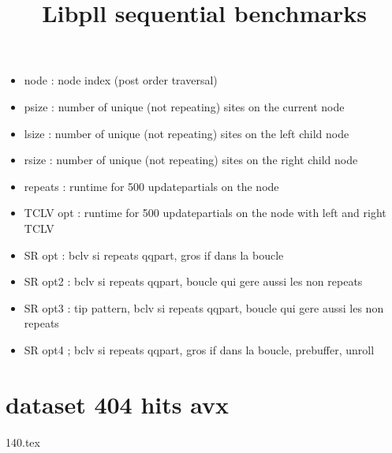 \documentclass[a4paper]{article}
\begin{document}
\newcommand*{\figuretitle}[1]{%
    {\centering%
    \textbf{#1}%
    \par\medskip}%
}


\title{Libpll sequential benchmarks}
\maketitle


\begin{itemize}
\item node : node index (post order traversal)
\item psize : number of unique (not repeating) sites on the current node
\item lsize : number of unique (not repeating) sites on the left child node
\item rsize : number of unique (not repeating) sites on the right child node
\item repeats : runtime for 500 updatepartials on the node
\item TCLV opt : runtime for 500 updatepartials on the node with left and right TCLV
\end{itemize}



\begin{itemize}
\item SR opt : bclv si repeats qqpart, gros if dans la boucle
\item SR opt2 :  bclv si repeats qqpart, boucle qui gere aussi les non repeats
\item SR opt3 : tip pattern, bclv si repeats qqpart, boucle qui gere aussi les non repeats
\item SR opt4 ; bclv si repeats qqpart, gros if dans la boucle, prebuffer, unroll
\end{itemize}


\section{dataset 404 hits avx}
%
{140.tex}
\end{document}
